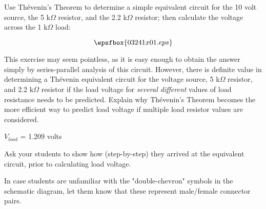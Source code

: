

Use Th\'evenin's Theorem to determine a simple equivalent circuit for the 10 volt source, the 5 k$\Omega$ resistor, and the 2.2 k$\Omega$ resistor; then calculate the voltage across the 1 k$\Omega$ load:

$$\epsfbox{03241x01.eps}$$

This exercise may seem pointless, as it is easy enough to obtain the answer simply by series-parallel analysis of this circuit.  However, there is definite value in determining a Th\'evenin equivalent circuit for the voltage source, 5 k$\Omega$ resistor, and 2.2 k$\Omega$ resistor if the load voltage for {\it several different} values of load resistance needs to be predicted.  Explain why Th\'evenin's Theorem becomes the more efficient way to predict load voltage if multiple load resistor values are considered.







$V_{load}$ = 1.209 volts







Ask your students to show how (step-by-step) they arrived at the equivalent circuit, prior to calculating load voltage.

In case students are unfamiliar with the "double-chevron" symbols in the schematic diagram, let them know that these represent male/female connector pairs.




